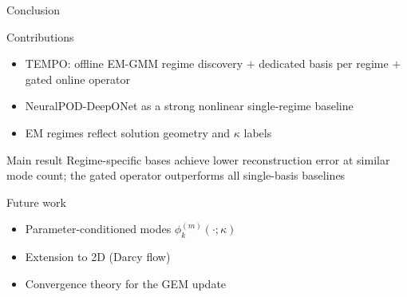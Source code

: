 \documentclass[aspectratio=169]{beamer}
\begin{document}
\begin{frame}{Conclusion}

\begin{block}{Contributions}
  \begin{itemize}
    \item TEMPO: offline EM-GMM regime discovery $+$ dedicated basis per regime $+$ gated online operator
    \item NeuralPOD-DeepONet as a strong nonlinear single-regime baseline
    \item EM regimes reflect solution geometry and $\kappa$ labels
  \end{itemize}
\end{block}

\begin{block}{Main result}
  Regime-specific bases achieve lower reconstruction error at similar mode count;
  the gated operator outperforms all single-basis baselines
\end{block}

\begin{block}{Future work}
  \begin{itemize}
    \item Parameter-conditioned modes $\phi_k^{(m)}(\cdot;\kappa)$
    \item Extension to 2D (Darcy flow)
    \item Convergence theory for the GEM update
  \end{itemize}
\end{block}

\end{frame}
\end{document}
